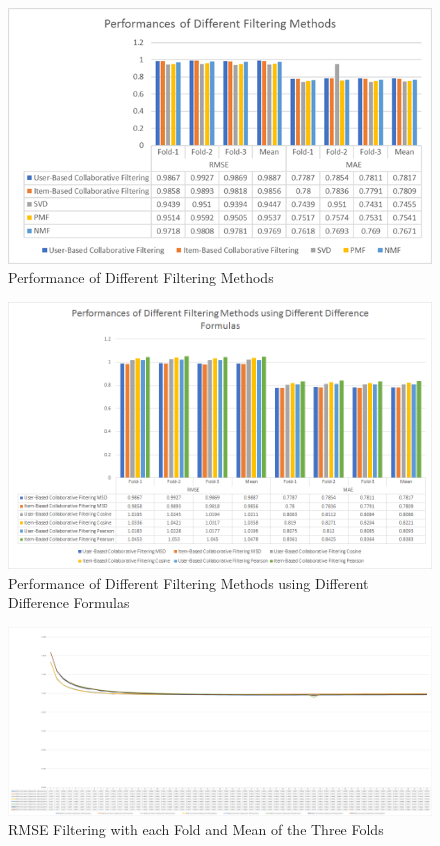 \documentclass[times]{article}
\begin{document}
		\begin{figure}
			\includegraphics[width=\linewidth]{9.png}
			\caption{Performance of Different Filtering Methods}
			\label{fig:9}
		\end{figure}

		\begin{figure}
			\includegraphics[width=\linewidth]{13.png}
			\caption{Performance of Different Filtering Methods using Different Difference Formulas}
			\label{fig:13}
		\end{figure}

		\begin{figure}
			\includegraphics[width=\linewidth]{14.png}
			\caption{RMSE Filtering with each Fold and Mean of the Three Folds}
			\label{fig:14}
		\end{figure}
\end{document}
